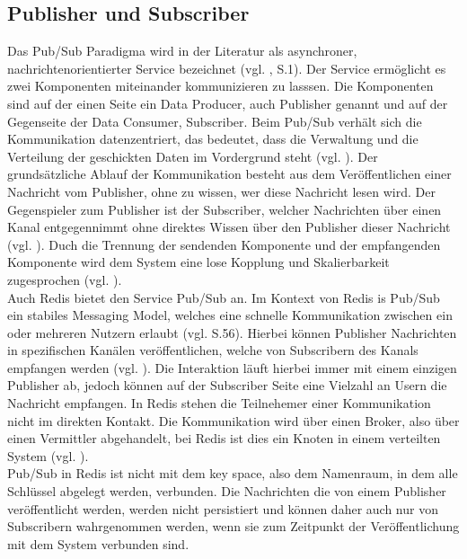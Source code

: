 
\subsection{Publisher und Subscriber}
\label{subsec:pubsub}

Das \acs{Pub/Sub} Paradigma wird in der Literatur als asynchroner, nachrichtenorientierter Service bezeichnet (vgl. \cite{XinZhang}, S.1). Der Service ermöglicht es zwei Komponenten miteinander kommunizieren zu lasssen. Die Komponenten sind auf der einen Seite ein Data Producer, auch Publisher genannt und auf der Gegenseite der Data Consumer, Subscriber.
Beim \acs{Pub/Sub} verhält sich die Kommunikation datenzentriert, das bedeutet, dass die Verwaltung und die Verteilung der geschickten Daten im Vordergrund steht (vgl. \cite{Salehi2018}).
Der grundsätzliche Ablauf der Kommunikation besteht aus dem Veröffentlichen einer Nachricht vom Publisher, ohne zu wissen, wer diese Nachricht lesen wird. Der Gegenspieler zum Publisher ist der Subscriber, welcher Nachrichten über einen Kanal entgegennimmt ohne direktes Wissen über den Publisher dieser Nachricht (vgl. \cite{Salehi2018}).
Duch die Trennung der sendenden Komponente und der empfangenden Komponente wird dem System eine lose Kopplung und Skalierbarkeit zugesprochen (vgl. \cite{Salehi2018}).
\\
Auch \acs{Redis} bietet den Service \acs{Pub/Sub} an. Im Kontext von \acs{Redis} is \acs{Pub/Sub} ein stabiles Messaging Model, welches eine schnelle Kommunikation zwischen ein oder mehreren Nutzern erlaubt (vgl. \cite{Nelson2016} S.56).
Hierbei können Publisher Nachrichten in spezifischen Kanälen veröffentlichen, welche von Subscribern des Kanals empfangen werden (vgl. \cite{Redis-PubSub}). Die Interaktion läuft hierbei immer mit einem einzigen Publisher ab, jedoch können auf der Subscriber Seite eine Vielzahl an Usern die Nachricht empfangen.
In \acs{Redis} stehen die Teilnehemer einer Kommunikation nicht im direkten Kontakt. Die Kommunikation wird über einen Broker, also über einen Vermittler abgehandelt, bei \acs{Redis} ist dies ein Knoten in einem verteilten System (vgl. \cite{Redis-PubSub}).
\\
\acs{Pub/Sub} in \acs{Redis} ist nicht mit dem key space, also dem Namenraum, in dem alle Schlüssel abgelegt werden, verbunden. Die Nachrichten die von einem Publisher veröffentlicht werden, werden nicht persistiert und können daher auch nur von Subscribern wahrgenommen werden, wenn sie zum Zeitpunkt der Veröffentlichung mit dem System verbunden sind. 

